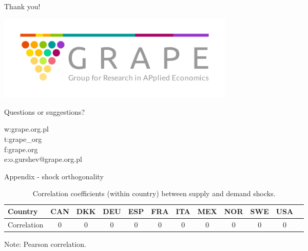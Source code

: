 \documentclass[10pt,leqno,aspectratio=169,presentation]{beamer} %
\begin{document}
\begin{frame}
\begin{center}
\begin{Large}
\vspace{10pt}
Thank you! 
\end{Large}

\includegraphics[width=0.5\textwidth]{Slides/logo_solo.png}

\begin{Large}
\vspace{10pt}
Questions or suggestions? 
\end{Large}
\end{center}
\bigskip


\alert{w}:\hspace{9pt}grape.org.pl \\
\alert{t}:\hspace{12pt}grape\_org \\
\alert{f}:\hspace{12pt}grape.org \\
\alert{e}:\hspace{11pt}o.gurshev@grape.org.pl
\end{frame}

\begin{frame}{Appendix - shock orthogonality}
\setcounter{table}{0}
\label{ortho}
\begin{table}[H]
\captionsetup{justification=raggedright,
singlelinecheck=false
}
    \centering
    \caption{Correlation coefficients (within country) between supply and demand shocks.}
    \begin{tabular}{l ccc ccc ccc cc}
    \toprule
 

	Country&	CAN	&	DKK	&	DEU	&	ESP	&	FRA	&	ITA	&	MEX	&	NOR	&	SWE	&	USA	\\    \midrule
Correlation	&	0	&	0	&	0	&	0	&	0	&	0	&	0	&	0	&	0	&	0	\\

    \bottomrule
    \end{tabular}
    \begin{minipage}{\linewidth}
    \footnotesize
    \centering
    Note: Pearson correlation.
    \end{minipage}
\end{table}
\hyperlink{main}{}
\hyperlink{disturb}{}
\end{frame}
\end{document}
